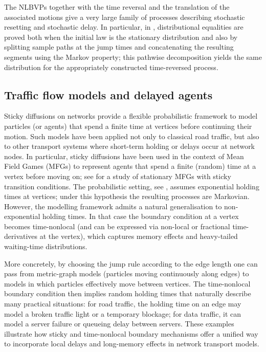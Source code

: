 \documentclass[11pt,a4paper]{article}
\theoremstyle{plain}
\theoremstyle{definition}
\theoremstyle{remark}
\begin{document}
		
		The NLBVPs together with the time reversal and the translation of the associated motions give a very large family of processes describing stochastic resetting and stochastic delay. 
		In particular, in \cite{ColDovPag}, distributional equalities are proved both when the initial law is the stationary distribution and also by splitting sample paths at the jump times and concatenating the resulting segments using the Markov property; this pathwise decomposition yields the same distribution for the appropriately constructed time-reversed process.
		
		\subsection{Traffic flow models and delayed agents}
		\label{subsec:traffic-delay}
		
		Sticky diffusions on networks provide a flexible probabilistic framework to model particles (or agents) that spend a finite time at vertices before continuing their motion. 
		Such models have been applied not only to classical road traffic, but also to other transport systems where short-term holding or delays occur at network nodes. 
		In particular, sticky diffusions have been used in the context of Mean Field Games (MFGs) to represent agents that spend a finite (random) time at a vertex before moving on; see \cite{berry2025stationary} for a study of stationary MFGs with sticky transition conditions. The probabilistic setting, see  \cite{berry2024sticky}, assumes exponential holding times at vertices; under this hypothesis the resulting processes are Markovian. 
		However, the modelling framework admits a natural generalisation to non-exponential holding times. 
		In that case the boundary condition at a vertex becomes time-nonlocal (and can be expressed via non-local or fractional time-derivatives at the vertex), which captures memory effects and heavy-tailed waiting-time distributions.
		
		More concretely, by choosing the jump rule according to the edge length one can pass from metric-graph models (particles moving continuously along edges) to models in which particles effectively move between vertices. 
		The time-nonlocal boundary condition then implies random holding times that naturally describe many practical situations: for road traffic, the holding time on an edge may model a broken traffic light or a temporary blockage; for data traffic, it can model a server failure or queueing delay between servers. 
		These examples illustrate how sticky and time-nonlocal boundary mechanisms offer a unified way to incorporate local delays and long-memory effects in network transport models.
		
\end{document}
